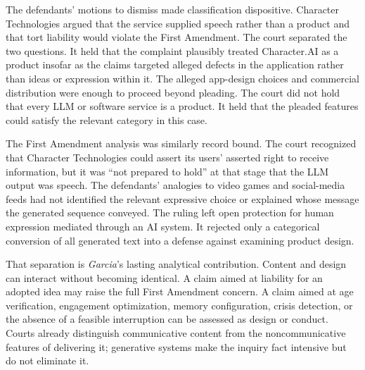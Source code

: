 The defendants' motions to dismiss made classification dispositive. Character Technologies argued that the service supplied speech rather than a product and that tort liability would violate the First Amendment. The court separated the two questions. It held that the complaint plausibly treated Character.AI as a product insofar as the claims targeted alleged defects in the application rather than ideas or expression within it. The alleged app-design choices and commercial distribution were enough to proceed beyond pleading. The court did not hold that every LLM or software service is a product. It held that the pleaded features could satisfy the relevant category in this case.

The First Amendment analysis was similarly record bound. The court recognized that Character Technologies could assert its users' asserted right to receive information, but it was ``not prepared to hold'' at that stage that the LLM output was speech. The defendants' analogies to video games and social-media feeds had not identified the relevant expressive choice or explained whose message the generated sequence conveyed. The ruling left open protection for human expression mediated through an AI system. It rejected only a categorical conversion of all generated text into a defense against examining product design.

That separation is \emph{Garcia}'s lasting analytical contribution. Content and design can interact without becoming identical. A claim aimed at liability for an adopted idea may raise the full First Amendment concern. A claim aimed at age verification, engagement optimization, memory configuration, crisis detection, or the absence of a feasible interruption can be assessed as design or conduct. Courts already distinguish communicative content from the noncommunicative features of delivering it; generative systems make the inquiry fact intensive but do not eliminate it.

